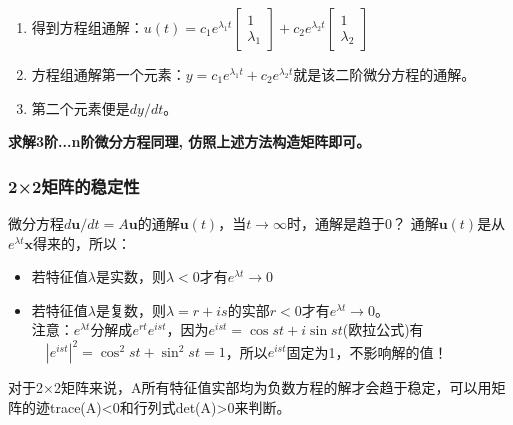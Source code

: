 \documentclass[UTF8]{article}
\begin{document}
\begin{enumerate}
        \item 得到方程组通解：$u(t)=c_{1} e^{\lambda_{1} t}\left[\begin{array}{c}{1} \\ {\lambda_{1}}\end{array}\right]+c_{2} e^{\lambda_{2} t}\left[\begin{array}{c}{1} \\ {\lambda_{2}}\end{array}\right]$
        \item 方程组通解第一个元素：$y=c_{1} e^{\lambda_{1} t}+c_{2} e^{\lambda_{2} t}$就是该二阶微分方程的通解。
        \item 第二个元素便是$d y / d t$。
    \end{enumerate}
    \textbf{求解3阶...n阶微分方程同理, 仿照上述方法构造矩阵即可。}

    \subsubsection{2×2矩阵的稳定性}
    微分方程$d \boldsymbol{u} / d t=A \boldsymbol{u}$的通解$\bm{u}(t)$，当$t \rightarrow \infty$时，通解是趋于0？
    通解$\bm{u}(t)$是从$e^{\lambda t} \boldsymbol{x}$得来的，所以：
    \begin{itemize}
        \item 若特征值$\lambda$是实数，则$\lambda < 0$才有$e^{\lambda t} \rightarrow 0$
        \item 若特征值$\lambda$是复数，则$\lambda=r+i s$的实部$r <0$才有$e^{\lambda t} \rightarrow 0$。\\注意：$e^{\lambda t}$分解成$e^{r t} e^{i s t}$，因为$e^{i s t}=\cos s t+i \sin s t$(欧拉公式)有$\quad\left|e^{i s t}\right|^{2}=\cos ^{2} s t+\sin ^{2} s t=1$，所以$e^{i s t}$固定为1，不影响解的值！
    \end{itemize}
    对于2×2矩阵来说，A所有特征值实部均为负数方程的解才会趋于稳定，可以用矩阵的迹trace(A)<0和行列式det(A)>0来判断。
\end{document}
